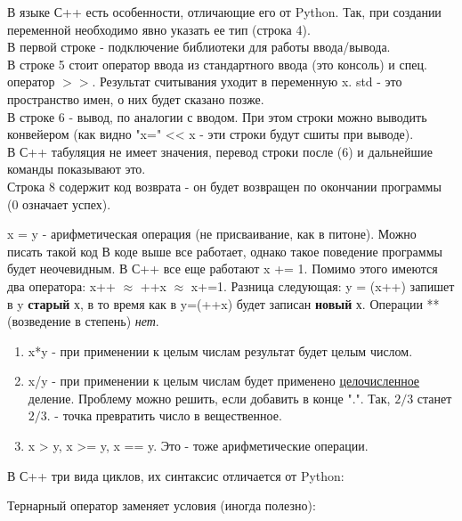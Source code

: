 \begin{lecture}[\lectureSubject]
\begin{lecSection}[Синтаксис]
		В языке С++ есть особенности, отличающие его от Python. Так, при создании переменной необходимо явно указать ее тип (строка 4).\\
		В первой строке - подключение библиотеки для работы ввода/вывода.\\
		В строке 5 стоит оператор ввода из стандартного ввода (это консоль) и спец. оператор $>>$. Результат считывания уходит в переменную x. std - это пространство имен, о них будет сказано позже. \\
		В строке 6 - вывод, по аналогии с вводом. При этом строки можно выводить конвейером (как видно "x=" << x - эти строки будут сшиты при выводе).\\
		В С++ табуляция не имеет значения, перевод строки после (6) и дальнейшие команды показывают это. \\
		Строка 8 содержит код возврата - он будет возвращен по окончании программы (0 означает успех).
		 
	\end{lecSection}
	\begin{lecSection}
		x = y - арифметическая операция (не присваивание, как в питоне). Можно писать такой код
		В коде выше все работает, однако такое поведение программы будет неочевидным.
		В С++ все еще работают x += 1. Помимо этого имеются два оператора: x++ $\approx$ ++x $\approx$ x+=1.
		Разница следующая: y = (x++) запишет в y \textbf{старый} х, в то время как в y=(++x) будет записан \textbf{новый} х. Операции ** (возведение в степень) \textit{нет}.
		\begin{enumerate}
			\item x*y - при применении к целым числам результат будет целым числом.
			\item x/y - при применении к целым числам будет применено \underline{целочисленное} деление. Проблему можно решить, если добавить в конце ".". Так, $2/3$ станет $2/3.$ - точка превратить число в вещественное.
			\item x > y, x >= y, x == y. Это - тоже арифметические операции.
		\end{enumerate}
	\end{lecSection}
	\begin{lecSection}
		В С++ три вида циклов, их синтаксис отличается от Python:
	\end{lecSection}
	\begin{lecSection}
		Тернарный оператор заменяет условия (иногда полезно):
	\end{lecSection}
	\begin{lecSection}
	\end{lecSection}
\end{lecture}
